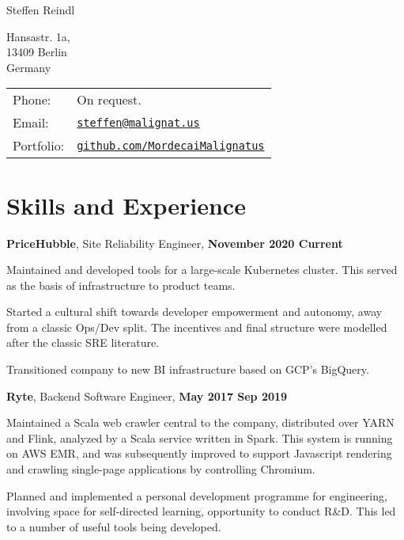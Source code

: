 \documentclass[a4paper]{article}
\def\name{Steffen Reindl}
\renewenvironment{itemize}{
  \begin{list}{}{
      \setlength{\leftmargin}{1.5em}
      \setlength{\itemsep}{5pt}
  }
}{
  \end{list}
}
\begin{document}
{\huge \name}
\vspace{0.25in}

\begin{minipage}{0.45\linewidth}
  Hansastr. 1a, \\
  13409 Berlin \\
  Germany
\end{minipage}
\begin{minipage}{0.45\linewidth}
  \begin{tabular}{ll}
    Phone: & On request. \\
    Email: & \href{mailto:steffen@malignat.us}{\tt steffen@malignat.us} \\
    Portfolio: & \href{https://github.com/MordecaiMalignatus/}{\tt github.com/MordecaiMalignatus}
  \end{tabular}
\end{minipage}

\section*{Skills and Experience}

\begin{itemize}
\item \textbf{PriceHubble}, Site Reliability Engineer, \textbf{November 2020 {\textendash} Current}
  \begin{itemize}
    \item Maintained and developed tools for a large-scale Kubernetes
      cluster. This served as the basis of infrastructure to product teams.
    \item Started a cultural shift towards developer empowerment and autonomy,
      away from a classic Ops/Dev split. The incentives and final structure were
      modelled after the classic SRE literature.
    \item Transitioned company to new BI infrastructure based on GCP's
      BigQuery.
  \end{itemize}
\item \textbf{Ryte}, Backend Software Engineer, \textbf{May 2017 {\textendash} Sep 2019}
   \begin{itemize}
      \item Maintained a Scala web crawler central to the company,
        distributed over YARN and Flink, analyzed by a Scala service
        written in Spark. This system is running on AWS EMR, and was
        subsequently improved to support Javascript rendering and crawling
        single-page applications by controlling Chromium.
      \item Planned and implemented a personal development programme for
        engineering, involving space for self-directed learning,
        opportunity to conduct R\&D. This led to a number of useful tools
        being developed.
  \end{itemize}
\end{itemize}
\end{document}
